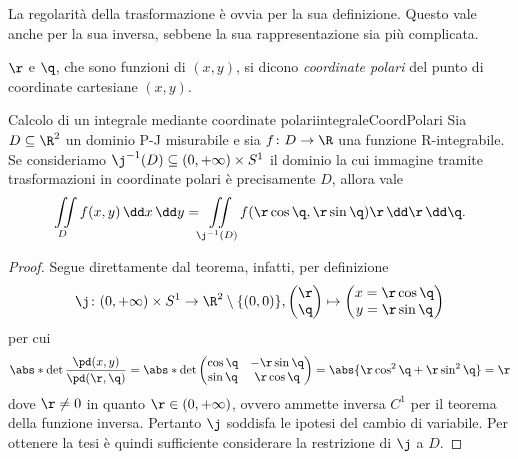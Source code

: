 \begin{oss}
	La regolarità della trasformazione è ovvia per la sua definizione. Questo vale anche per la sua inversa, sebbene la sua rappresentazione sia più complicata.
\end{oss}

\begin{notz}
	\(\r\) e \(\q\), che sono funzioni di \((x,y)\), si dicono \emph{coordinate polari} del punto di coordinate cartesiane \((x,y)\).
\end{notz}

\begin{prop}{Calcolo di un integrale mediante coordinate polari}{integraleCoordPolari}
	Sia \(D\subseteq\R^2\) un dominio P-J misurabile e sia \(f\colon D\to\R\) una funzione R-integrabile.
	Se consideriamo \(\j^{-1}(D)\subseteq (0,+\infty)\times S^1\) il dominio la cui immagine tramite trasformazioni in coordinate polari è precisamente \(D\), allora vale
	\[
		\iint\limits_D f(x,y)\,\dd x\,\dd y = \iint\limits_{\j^{-1}(D)} f(\r\cos \q,\r\sin \q)\r\,\dd \r\,\dd \q.
	\]
\end{prop}

\begin{proof}
	Segue direttamente dal teorema, infatti, per definizione
	\[
		\j\colon (0,+\infty)\times S^1 \to \R^2\setminus \{(0,0)\},	\begin{pmatrix}
			\r \\
			\q
		\end{pmatrix}
		\mapsto	\begin{pmatrix}
			x = \r\cos \q \\
			y = \r\sin \q
		\end{pmatrix}
	\]
	per cui
	\[
		\abs*{\det \frac{\pd(x,y)}{\pd(\r,\q)}} = \abs*{\det 	\begin{pmatrix}
				\cos \q & -\r\sin \q \\
				\sin \q & \r\cos \q
			\end{pmatrix}}
		= \abs{\r\cos^2\q + \r\sin^2\q} = \r
	\]
	dove \(\r\neq 0\) in quanto \(\r\in(0,+\infty)\), ovvero ammette inversa \(C^1\) per il teorema della funzione inversa.
	Pertanto \(\j\) soddisfa le ipotesi del cambio di variabile.
	Per ottenere la tesi è quindi sufficiente considerare la restrizione di \(\j\) a \(D\).
\end{proof}

